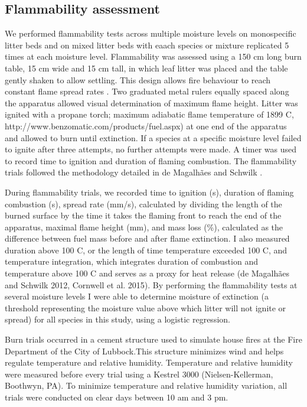 \documentclass[fire,article,submit,moreauthors,pdftex]{Definitions/mdpi}
\begin{document}
\subsection{Flammability assessment}

We performed flammability tests across multiple moisture levels on monospecific litter beds and on mixed litter beds with eaach species or mixture replicated 5 times at each moisture level. Flammability was assessed using a 150 cm long burn table, 15 cm wide and 15 cm tall, in which leaf litter was placed and the table gently shaken to allow settling. This design allows fire behaviour to reach constant flame spread rates \cite{Magalhaes+Schwilk-2012}. Two graduated metal rulers   equally spaced along the apparatus allowed visual determination of maximum flame height.
Litter was ignited with a propane torch; maximum adiabatic flame temperature of 1899 C, http://www.benzomatic.com/products/fuel.aspx) at one end of the apparatus and allowed to burn until extinction. If a species at a specific moisture level failed to ignite after three attempts, no further attempts were made.  A timer was used to record time to ignition and duration of flaming combustion. The flammability trials followed the methodology detailed in de Magalhães and Schwilk \cite{Magalhaes+Schwilk-2012}. 

 
During flammability trials, we recorded time to ignition (s), duration of flaming combustion (s), spread rate (mm/s), calculated by dividing the length of the burned surface by the time it takes the flaming front to reach the end of the apparatus, maximal flame height (mm), and mass loss (\%), calculated as the difference between fuel mass before and after flame extinction. I also measured duration above 100 C, or the length of time temperature exceeded 100 C, and temperature integration, which integrates duration of combustion and temperature above 100 C and serves as a proxy for heat release (de Magalhães and Schwilk 2012, Cornwell et al. 2015). By performing the flammability tests at several moisture levels I were able to determine moisture of extinction (a threshold representing the moisture value above which litter will not ignite or spread) for all species in this study, using a logistic regression.

Burn trials occurred in a cement structure used to simulate house fires at the Fire Department of the City of Lubbock.This structure minimizes wind and helps regulate temperature and relative humidity. Temperature and relative humidity were measured before every trial using a Kestrel 3000 (Nielsen-Kellerman, Boothwyn, PA). To minimize temperature and relative humidity variation, all trials were conducted on clear days between 10 am and 3 pm. 
\end{document}
